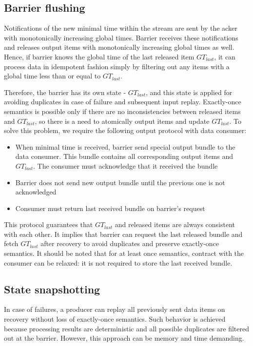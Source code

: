 \subsection{Barrier flushing}
Notifications of the new minimal time within the stream are sent by the acker with monotonically increasing global times. Barrier receives these notifications and releases output items with monotonically increasing global times as well. Hence, if barrier knows the global time of the last released item $GT_{last}$, it can process data in idempotent fashion simply by filtering out any items with a global time less than or equal to $GT_{last}$. 

Therefore, the barrier has its own state - $GT_{last}$, and this state is applied for avoiding duplicates in case of failure and subsequent input replay. Exactly-once semantics is possible only if there are no inconsistencies between released items and $GT_{last}$, so there is a need to atomically output items and update $GT_{last}$. To solve this problem, we require the following output protocol with data consumer: 

\begin{itemize}
    \item When minimal time is received, barrier send special output bundle to the data consumer. This bundle contains all corresponding output items and $GT_{last}$. The consumer must acknowledge that it received the bundle
    \item Barrier does not send new output bundle until the previous one is not acknowledged
    \item Consumer must return last received bundle on barrier's request 
\end{itemize}

This protocol guarantees that $GT_{last}$ and released items are always consistent with each other. It implies that barrier can request the last released bundle and fetch $GT_{last}$ after recovery to avoid duplicates and preserve exactly-once semantics. It should be noted that for at least once semantics, contract with the consumer can be relaxed: it is not required to store the last received bundle.

\subsection{State snapshotting}
In case of failures, a producer can replay all previously sent data items on recovery without loss of exactly-once semantics. Such behavior is achieved because processing results are deterministic and all possible duplicates are filtered out at the barrier. However, this approach can be memory and time demanding. 

